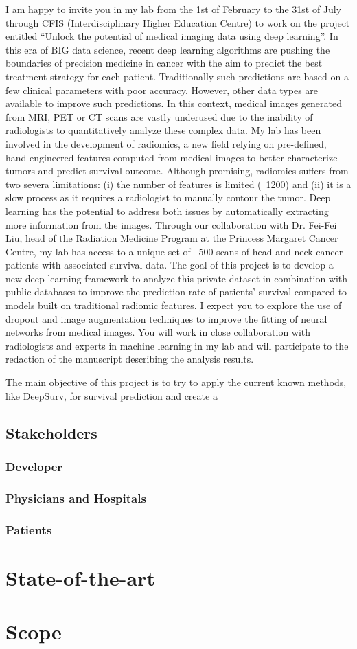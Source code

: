 \documentclass[a4paper, 12pt]{article}
\begin{document}
I am happy to invite you in my lab from the 1st of February to the 31st of July through CFIS (Interdisciplinary
Higher Education Centre) to work on the project entitled “Unlock the potential of medical imaging data using
deep learning”. In this era of BIG data science, recent deep learning algorithms are pushing the boundaries of
precision medicine in cancer with the aim to predict the best treatment strategy for each patient. Traditionally
such predictions are based on a few clinical parameters with poor accuracy. However, other data types are
available to improve such predictions. In this context, medical images generated from MRI, PET or CT scans
are vastly underused due to the inability of radiologists to quantitatively analyze these complex data. My lab
has been involved in the development of radiomics, a new field relying on pre-defined, hand-engineered
features computed from medical images to better characterize tumors and predict survival outcome. Although
promising, radiomics suffers from two severa limitations: (i) the number of features is limited (~1200) and (ii) it
is a slow process as it requires a radiologist to manually contour the tumor. Deep learning has the potential to
address both issues by automatically extracting more information from the images.
Through our collaboration with Dr. Fei-Fei Liu, head of the Radiation Medicine Program at the Princess
Margaret Cancer Centre, my lab has access to a unique set of ~500 scans of head-and-neck cancer patients
with associated survival data. The goal of this project is to develop a new deep learning framework to analyze
this private dataset in combination with public databases to improve the prediction rate of patients’ survival
compared to models built on traditional radiomic features. I expect you to explore the use of dropout and image
augmentation techniques to improve the fitting of neural networks from medical images. You will work in close
collaboration with radiologists and experts in machine learning in my lab and will participate to the redaction of
the manuscript describing the analysis results.


The main objective of this project is to try to apply the current known methods, like DeepSurv, 
for survival prediction and create a 

\subsection{Stakeholders}

\subsubsection{Developer}
\subsubsection{Physicians and Hospitals}
\subsubsection{Patients}

\section{State-of-the-art}

\section{Scope}

\pagebreak
\printbibliography{}
\end{document}
